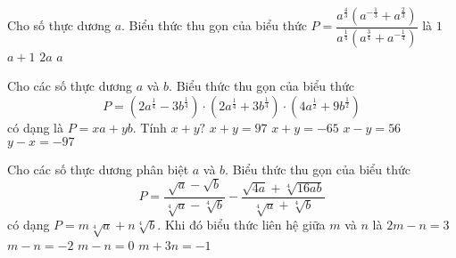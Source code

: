 \begin{ex}%
	Cho số thực dương $a$. Biểu thức thu gọn của biểu thức $P=\dfrac{a^{\tfrac{4}{3}}\left(a^{-\tfrac{1}{3}}+a^{\tfrac{2}{3}}\right)}{a^{\tfrac{1}{4}}\left(a^{\tfrac{3}{4}}+a^{-\tfrac{1}{4}}\right)}$ là 
	\choice
	{$1$}
	{$a+1$}
	{$2a$}
	{\True $a$}
\end{ex}
\begin{ex}%
	Cho các số thực dương $a$ và $b$. Biểu thức thu gọn của biểu thức \[P=\left(2a^{\tfrac{1}{4}}-3b^{\tfrac{1}{4}}\right)\cdot\left(2a^{\tfrac{1}{4}}+3b^{\tfrac{1}{4}}\right)\cdot\left(4a^{\tfrac{1}{2}}+9b^{\tfrac{1}{2}}\right)\] có dạng là $P=xa+yb$. Tính $x+y?$ 
	\choice
	{$x+y=97$}
	{\True $x+y=-65$}
	{$x-y=56$}
	{$y-x=-97$}
\end{ex}
\begin{ex}%
	Cho các số thực dương phân biệt $a$ và $b$. Biểu thức thu gọn của biểu thức \[P=\dfrac{\sqrt{a}-\sqrt{b}}{\sqrt[4]{a}-\sqrt[4]{b}}-\dfrac{\sqrt{4a}+\sqrt[4]{16ab}}{\sqrt[4]{a}+\sqrt[4]{b}}\] có dạng $P=m\sqrt[4]{a}+n\sqrt[4]{b}$. Khi đó biểu thức liên hệ giữa $m$ và $n$ là 
	\choice
	{$2m-n=3$}
	{\True $m-n=-2$}
	{$m-n=0$}
	{$m+3n=-1$}
\end{ex}
